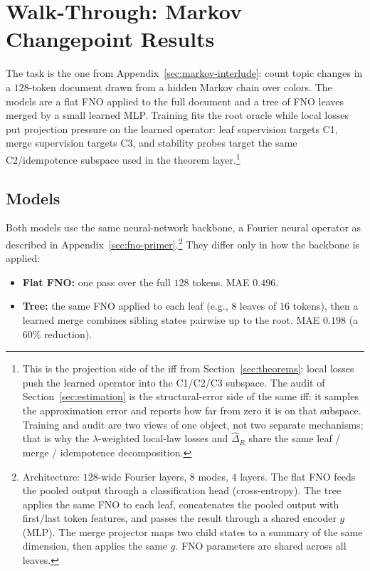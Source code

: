 \section{Walk-Through: Markov Changepoint Results}\label{sec:markov-walkthrough}

The task is the one from Appendix~\ref{sec:markov-interlude}: count topic changes in a $128$-token document drawn from a hidden Markov chain over colors. The models are a flat FNO applied to the full document and a tree of FNO leaves merged by a small learned MLP. Training fits the root oracle while local losses put projection pressure on the learned operator: leaf supervision targets C1, merge supervision targets C3, and stability probes target the same C2/idempotence subspace used in the theorem layer.\footnote{This is the projection side of the iff from Section~\ref{sec:theorems}: local losses push the learned operator into the C1/C2/C3 subspace. The audit of Section~\ref{sec:estimation} is the structural-error side of the same iff: it samples the approximation error and reports how far from zero it is on that subspace. Training and audit are two views of one object, not two separate mechanisms; that is why the $\lambda$-weighted local-law losses and $\hat\Delta_R$ share the same leaf / merge / idempotence decomposition.}

\subsection{Models}\label{sec:fno-baseline}

Both models use the same neural-network backbone, a Fourier neural
operator as described in Appendix~\ref{sec:fno-primer}.\footnote{Architecture: $128$-wide Fourier layers, $8$ modes, $4$ layers. The flat FNO feeds the pooled output through a classification head (cross-entropy). The tree applies the same FNO to each leaf, concatenates the pooled output with first/last token features, and passes the result through a shared encoder $g$ (MLP). The merge projector maps two child states to a summary of the same dimension, then applies the same $g$. FNO parameters are shared across all leaves.} They differ only in how the backbone is applied:

\begin{itemize}[leftmargin=1.5em]
    \item \textbf{Flat FNO:} one pass over the full $128$ tokens. MAE $0.496$.
    \item \textbf{Tree:} the same FNO applied to each leaf (e.g., $8$ leaves of $16$ tokens), then a learned merge combines sibling states pairwise up to the root. MAE $0.198$ (a $60\%$ reduction).
\end{itemize}

